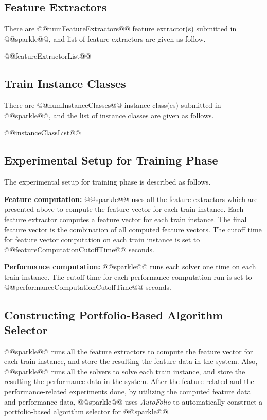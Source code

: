 \documentclass[british]{article}
\begin{document}
\subsection{Feature Extractors}
\label{sec:Feature_Extractors}
There are @@numFeatureExtractors@@ feature extractor(s) submitted in @@sparkle@@, and list of feature extractors are given as follow.

\begin{enumerate}
@@featureExtractorList@@
\end{enumerate}

\subsection{Train Instance Classes}
\label{sec:Train_Instance_Classes}
There are @@numInstanceClasses@@ instance class(es) submitted in @@sparkle@@, and the list of instance classes are given as follows.

\begin{enumerate}
@@instanceClassList@@
\end{enumerate}

\subsection{Experimental Setup for Training Phase}
\label{sec:Experimental_Setup_for_Training_Phase}

The experimental setup for training phase is described as follows.

\textbf{Feature computation:} @@sparkle@@ uses all the feature extractors which are presented above to compute the feature vector for each train instance. Each feature extractor computes a feature vector for each train instance. The final feature vector is the combination of all computed feature vectors. The cutoff time for feature vector computation on each train instance is set to @@featureComputationCutoffTime@@ seconds.

\textbf{Performance computation:} @@sparkle@@ runs each solver one time on each train instance. The cutoff time for each performance computation run is set to @@performanceComputationCutoffTime@@ seconds.

\subsection{Constructing Portfolio-Based Algorithm Selector}
\label{sec:Portfolio}

@@sparkle@@ runs all the feature extractors to compute the feature vector for each train instance, and store the resulting the feature data in the system. Also, @@sparkle@@ runs all the solvers to solve each train instance, and store the resulting the performance data in the system. After the feature-related and the performance-related experiments done, by utilizing the computed feature data and performance data, @@sparkle@@ uses \emph{AutoFolio} \cite{LinEtAl15} to automatically construct a portfolio-based algorithm selector for @@sparkle@@.
\end{document}
